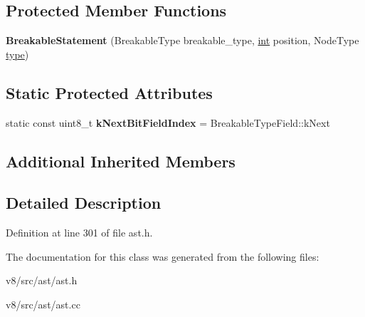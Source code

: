 \subsection*{Protected Member Functions}
\begin{DoxyCompactItemize}
\item 
\mbox{\label{classv8_1_1internal_1_1BreakableStatement_ad21a087a88338ce02883df24b2e19cac}} 
{\bfseries Breakable\+Statement} (Breakable\+Type breakable\+\_\+type, \mbox{\hyperlink{classint}{int}} position, Node\+Type \mbox{\hyperlink{classstd_1_1conditional_1_1type}{type}})
\end{DoxyCompactItemize}
\subsection*{Static Protected Attributes}
\begin{DoxyCompactItemize}
\item 
\mbox{\label{classv8_1_1internal_1_1BreakableStatement_a2e45b4edf836e26643c4a51a251fd22e}} 
static const uint8\+\_\+t {\bfseries k\+Next\+Bit\+Field\+Index} = Breakable\+Type\+Field\+::k\+Next
\end{DoxyCompactItemize}
\subsection*{Additional Inherited Members}


\subsection{Detailed Description}


Definition at line 301 of file ast.\+h.



The documentation for this class was generated from the following files\+:\begin{DoxyCompactItemize}
\item 
v8/src/ast/ast.\+h\item 
v8/src/ast/ast.\+cc\end{DoxyCompactItemize}
